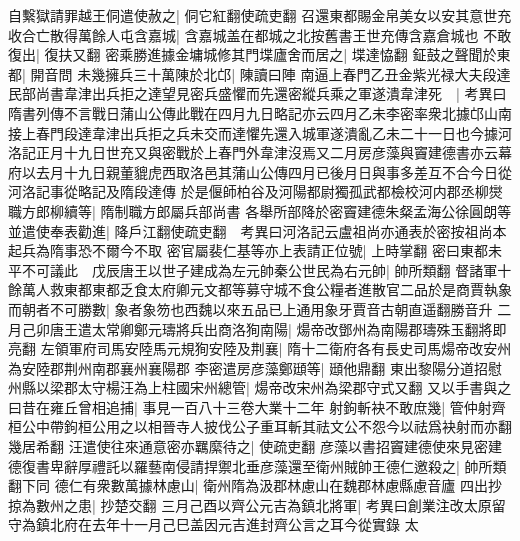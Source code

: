 自繫獄請罪越王侗遣使赦之|{
	侗它紅翻使疏吏翻}
召還東都賜金帛美女以安其意世充收合亡散得萬餘人屯含嘉城|{
	含嘉城盖在都城之北按舊書王世充傳含嘉倉城也}
不敢復出|{
	復扶又翻}
密乘勝進據金墉城修其門堞廬舍而居之|{
	堞達恊翻}
鉦鼓之聲聞於東都|{
	開音問}
未幾擁兵三十萬陳於北邙|{
	陳讀曰陣}
南逼上春門乙丑金紫光禄大夫段達民部尚書韋津出兵拒之達望見密兵盛懼而先還密縱兵乘之軍遂潰韋津死　|{
	考異曰隋書列傳不言戰日蒲山公傳此戰在四月九日略記亦云四月乙未李密率衆北據邙山南接上春門段達韋津出兵拒之兵未交而達懼先還入城軍遂潰亂乙未二十一日也今據河洛記正月十九日世充又與密戰於上春門外韋津沒焉又二月房彦藻與竇建德書亦云幕府以去月十九日親董貔虎西取洛邑其蒲山公傳四月已後月日與事多差互不合今日從河洛記事從略記及隋段達傳}
於是偃師柏谷及河陽都尉獨孤武都檢校河内郡丞柳爕職方郎柳續等|{
	隋制職方郎屬兵部尚書}
各舉所部降於密竇建德朱粲孟海公徐圓朗等並遣使奉表勸進|{
	降戶江翻使疏吏翻　考異曰河洛記云盧祖尚亦通表於密按祖尚本起兵為隋事恐不爾今不取}
密官屬裴仁基等亦上表請正位號|{
	上時掌翻}
密曰東都未平不可議此　戊辰唐王以世子建成為左元帥秦公世民為右元帥|{
	帥所類翻}
督諸軍十餘萬人救東都東都乏食太府卿元文都等募守城不食公糧者進散官二品於是商賈執象而朝者不可勝數|{
	象者象笏也西魏以來五品已上通用象牙賈音古朝直遥翻勝音升}
二月己卯唐王遣太常卿鄭元璹將兵出商洛狥南陽|{
	煬帝改鄧州為南陽郡璹殊玉翻將即亮翻}
左領軍府司馬安陸馬元規狥安陸及荆襄|{
	隋十二衛府各有長史司馬煬帝改安州為安陸郡荆州南郡襄州襄陽郡}
李密遣房彦藻鄭頲等|{
	頲他鼎翻}
東出黎陽分道招慰州縣以梁郡太守楊汪為上柱國宋州總管|{
	煬帝改宋州為梁郡守式又翻}
又以手書與之曰昔在雍丘曾相追捕|{
	事見一百八十三卷大業十二年}
射鉤斬袂不敢庶幾|{
	管仲射齊桓公中帶鉤桓公用之以相晉寺人披伐公子重耳斬其祛文公不怨今以祛爲袂射而亦翻幾居希翻}
汪遣使往來通意密亦羈縻待之|{
	使疏吏翻}
彦藻以書招竇建德使來見密建德復書卑辭厚禮託以羅藝南侵請捍禦北垂彦藻還至衛州賊帥王德仁邀殺之|{
	帥所類翻下同}
德仁有衆數萬據林慮山|{
	衛州隋為汲郡林慮山在魏郡林慮縣慮音廬}
四出抄掠為數州之患|{
	抄楚交翻}
三月己酉以齊公元吉為鎮北將軍|{
	考異曰創業注改太原留守為鎮北府在去年十一月己巳盖因元吉進封齊公言之耳今從實錄}
太

